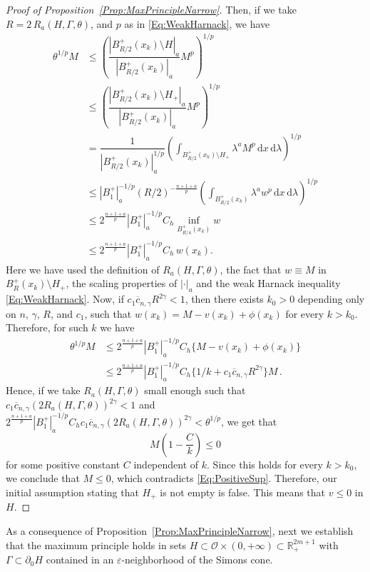 \documentclass[12pt,reqno]{amsart}
\theoremstyle{definition}
\theoremstyle{remark}
\newcommand{\con}[1]{\mathbb{#1}}
\newcommand{\R}{\con{R}} %
\newcommand{\ocal}{\mathcal{O}}
\newcommand{\s}{\gamma}
\renewcommand{\d}{\,\mathrm{d}} %
\newcommand{\bpar}[1]{\left ( {#1}\right )}
\numberwithin{equation}{section}
\begin{document}
\begin{proof}[Proof of Proposition~\ref{Prop:MaxPrincipleNarrow}]
	Then, if we take $R = 2\,R_a( H,\Gamma, \theta)$, and $p$ as in \eqref{Eq:WeakHarnack}, we have
	\begin{align*}
	\theta^{1/p} M & \leq \left (  \dfrac{|B^+_{R/2}(x_k)\setminus   H|_a}{|B^+_{R/2}(x_k)|_a}  M^p \right)^{1/p} \\
	& \leq \left (  \dfrac{|B^+_{R/2}(x_k)\setminus  H_+|_a}{|B^+_{R/2}(x_k)|_a}  M^p \right)^{1/p} \\
	&= \dfrac{1}{|B^+_{R/2}(x_k)|_a^{1/p}}  \left (  \int_{B^+_{R/2}(x_k)\setminus  H_+} \lambda ^a M^p \d x \d \lambda  \right)^{1/p} \\
	&\leq |B_1^+|_a^{-1/p} (R/2)^{- \frac{n+1+a}{p}} \left (  \int_{B^+_{R/2}(x_k)} \lambda ^a w^p \d x \d \lambda  \right)^{1/p} \\
	&\leq 2^{\frac{n+1+a}{p}}|B_1^+|_a^{-1/p} C_h \inf_{B^+_{R/4}(x_k)} w \\
	& \leq 2^{\frac{n+1+a}{p}}|B_1^+|_a^{-1/p} C_h \,  w(x_k).
	\end{align*}
	Here we have used the definition of $R_a( H,\Gamma,\theta)$, the fact that $w \equiv M$ in $B^+_R(x_k)\setminus H_+$, the scaling properties of $|\cdot |_a$ and the weak Harnack inequality \eqref{Eq:WeakHarnack}. Now, if $c_1 \overline{c}_{n,\s} R^{2\s} < 1$, then there exists $k_0>0$ depending only on $n$, $\s$, $R$, and $c_1$, such that $w(x_k) = M - v(x_k) + \phi(x_k)$ for every $k>k_0$. Therefore, for such $k$ we have
	\begin{align*}
		\theta^{1/p} M &\leq  2^{\frac{n+1+a}{p}}|B_1^+|_a^{-1/p} C_h \{M - v(x_k) + \phi(x_k) \} \\
		& \leq 2^{\frac{n+1+a}{p}}|B_1^+|_a^{-1/p} C_h \{1/k + c_1  \overline{c}_{n,\s} R^{2\s} \}M\,.
	\end{align*}
	Hence, if we take $R_a( H,\Gamma, \theta)$ small enough such that $c_1 \overline{c}_{n,\s} (2 R_a( H,\Gamma, \theta))^{2\s} < 1$ and $ 2^{\frac{n+1+a}{p}} |B_1^+|_a^{-1/p} C_h c_1 \overline{c}_{n,\s} (2 R_a( H,\Gamma, \theta))^{2\s} < \theta^{1/p}$, we get that
	$$
	M \bpar{1- \dfrac{C}{k}}\leq 0
	$$
	for some positive constant $C$ independent of $k$. Since this holds for every $k>k_0$, we conclude that $M \leq 0$, which contradicts \eqref{Eq:PositiveSup}. Therefore, our initial assumption stating that $ H_+$ is not empty is false. This means that $v\leq 0$ in $H$.
\end{proof}

As a consequence of Proposition~\ref{Prop:MaxPrincipleNarrow}, next we establish that the maximum principle holds in sets $ H \subset \ocal \times (0, +\infty) \subset \R^{2m+1}_+$ with $\Gamma \subset \partial_0  H$ contained in an $\varepsilon$-neighborhood of the Simons cone.
\end{document}
